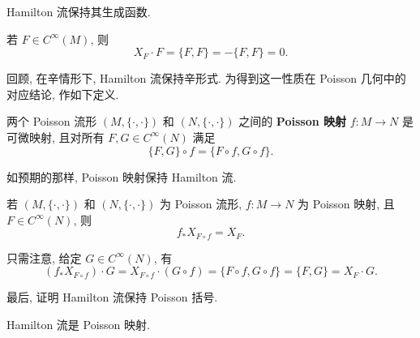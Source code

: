 \begin{RiemannProposition}\label{prop:poisson-hamiltonian-flow-preserves-generator}
Hamilton 流保持其生成函数.
\end{RiemannProposition}

\begin{RiemannProof}
若 $F\in C^\infty(M)$, 则
\[
  X_F\cdot F=\{F,F\}=-\{F,F\}=0.
\]
\end{RiemannProof}

回顾, 在辛情形下, Hamilton 流保持辛形式. 为得到这一性质在 Poisson 几何中的对应结论, 作如下定义.

\begin{RiemannDefinition}\label{def:poisson-map}
两个 Poisson 流形 $(M,\{\cdot,\cdot\})$ 和 $(N,\{\cdot,\cdot\})$ 之间的 \textbf{Poisson 映射} $f:M\to N$ 是可微映射, 且对所有 $F,G\in C^\infty(N)$ 满足
\[
  \{F,G\}\circ f=\{F\circ f,G\circ f\}.
\]
\end{RiemannDefinition}

如预期的那样, Poisson 映射保持 Hamilton 流.

\begin{RiemannProposition}\label{prop:poisson-map-intertwines-hamiltonian-fields}
若 $(M,\{\cdot,\cdot\})$ 和 $(N,\{\cdot,\cdot\})$ 为 Poisson 流形, $f:M\to N$ 为 Poisson 映射, 且 $F\in C^\infty(N)$, 则
\[
  f_*X_{F\circ f}=X_F.
\]
\end{RiemannProposition}

\begin{RiemannProof}
只需注意, 给定 $G\in C^\infty(N)$, 有
\[
  (f_*X_{F\circ f})\cdot G=X_{F\circ f}\cdot(G\circ f)
   =\{F\circ f,G\circ f\}=\{F,G\}=X_F\cdot G.
\]
\end{RiemannProof}

最后, 证明 Hamilton 流保持 Poisson 括号.

\begin{RiemannProposition}\label{prop:hamiltonian-flows-are-poisson-maps}
Hamilton 流是 Poisson 映射.
\end{RiemannProposition}

